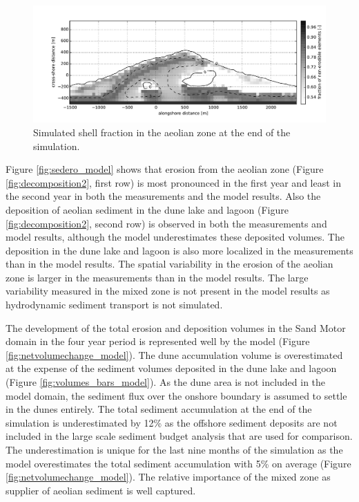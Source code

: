 \begin{figure}
  \centering
  \includegraphics[width=\columnwidth]{../Figures/model_shellfraction}
  \caption{Simulated shell fraction in the aeolian zone at the end of
    the simulation.}
  \label{fig:shellfraction_model}
\end{figure}

Figure \ref{fig:sedero_model} shows that erosion from the aeolian zone
(Figure \ref{fig:decomposition2}, first row) is most pronounced in the
first year and least in the second year in both the measurements and
the model results. Also the deposition of aeolian sediment in the dune
lake and lagoon (Figure \ref{fig:decomposition2}, second row) is
observed in both the measurements and model results, although the
model underestimates these deposited volumes. The deposition in the
dune lake and lagoon is also more localized in the measurements than
in the model results. The spatial variability in the erosion of the
aeolian zone is larger in the measurements than in the model
results. The large variability measured in the mixed zone is not
present in the model results as hydrodynamic sediment transport is not
simulated.

The development of the total erosion and deposition volumes in the
Sand Motor domain in the four year period is represented well by the
model (Figure \ref{fig:netvolumechange_model}). The dune accumulation
volume is overestimated at the expense of the sediment volumes
deposited in the dune lake and lagoon (Figure
\ref{fig:volumes_bars_model}). As the dune area is not included in the
model domain, the sediment flux over the onshore boundary is assumed
to settle in the dunes entirely. The total sediment accumulation at
the end of the simulation is underestimated by 12\% as the offshore
sediment deposits are not included in the large scale sediment budget
analysis that are used for comparison. The underestimation is unique
for the last nine months of the simulation as the model overestimates
the total sediment accumulation with 5\% on average (Figure
\ref{fig:netvolumechange_model}). The relative importance of the mixed
zone as supplier of aeolian sediment is well captured. 

